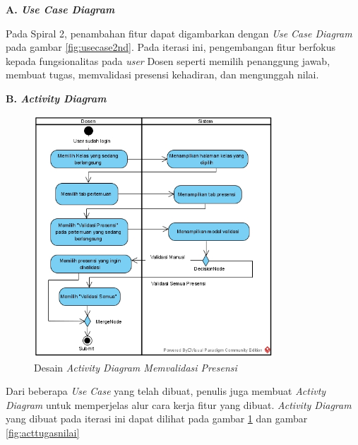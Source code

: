 \textbf{A. \textit{Use Case Diagram}}

	Pada Spiral 2, penambahan fitur dapat digambarkan dengan \textit{Use Case Diagram} pada gambar \ref{fig:usecase2nd}. Pada iterasi ini, pengembangan fitur berfokus kepada fungsionalitas pada \textit{user} Dosen seperti memilih penanggung jawab, membuat tugas, memvalidasi presensi kehadiran, dan mengunggah nilai.

\textbf{B. \textit{Activity Diagram}}

\begin{figure}[H]
	\centering
	\includegraphics[width=0.8\textwidth]{gambar/diagram/Memvalidasi presensi}
	\caption{Desain \textit{Activity Diagram Memvalidasi Presensi}}
	\label{fig:actvalidasipresensi}
\end{figure}
	Dari beberapa \textit{Use Case} yang telah dibuat, penulis juga membuat \textit{Activty Diagram} untuk memperjelas alur cara kerja fitur yang dibuat. \textit{Activity Diagram} yang dibuat pada iterasi ini dapat dilihat pada gambar \ref{fig:actvalidasipresensi} dan gambar \ref{fig:acttugasnilai}

